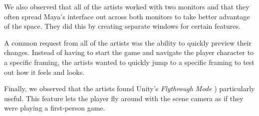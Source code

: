We also observed that all of the artists worked with two monitors and that they often spread Maya's interface out across both monitors to take better advantage of the space. They did this by creating separate windows for certain features. 

A common request from all of the artists was the ability to quickly preview their changes. Instead of having to start the game and navigate the player character to a specific framing, the artists wanted to quickly jump to a specific framing to test out how it feels and looks.

Finally, we observed that the artists found Unity's \textit{Flythrough Mode} \cite{unity_flyMode}) particularly useful. This feature lets the player fly around with the scene camera as if they were playing a first-person game.





